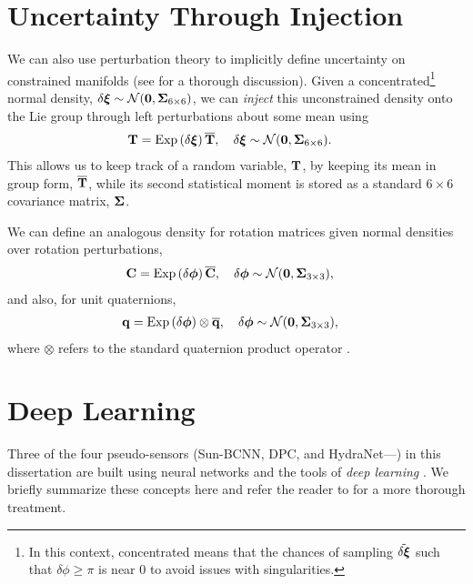 \section{Uncertainty Through Injection}

We can also use perturbation theory to implicitly define uncertainty on constrained manifolds (see \cite{Barfoot2014-ac} for a thorough discussion). Given a concentrated\footnote{In this context, concentrated means that the chances of sampling $\tilde{\delta \boldsymbol{\mathbf{\xi}}}$ such that $\delta \phi \geq \pi$ is near $0$ to avoid issues with singularities.} normal density, $\delta \boldsymbol{\mathbf{\xi}} \sim \mathcal{N}{}(\boldsymbol{\mathbf{0}}, \boldsymbol{\mathbf{\Sigma}}_{6 \times 6})$, we can \textit{inject} this unconstrained density onto the Lie group through left perturbations about some mean using
\begin{align}
\boldsymbol{\mathbf{T}} &= \mathrm{Exp}\left({\delta \boldsymbol{\mathbf{\xi}}}\right) \overline{\boldsymbol{\mathbf{T}}},\quad  \delta \boldsymbol{\mathbf{\xi}} \sim \mathcal{N}{}(\boldsymbol{\mathbf{0}}, \boldsymbol{\mathbf{\Sigma}}_{6 \times 6}).
\end{align}
This allows us to keep track of a random variable, $\boldsymbol{\mathbf{T}}$, by keeping its mean in group form, $\overline{\boldsymbol{\mathbf{T}}}$, while its second statistical moment is stored as a standard $6 \times 6$ covariance matrix, $\boldsymbol{\mathbf{\Sigma}}$.

We can define an analogous density for rotation matrices given normal densities over rotation perturbations,
\begin{align}
\boldsymbol{\mathbf{C}} &= \mathrm{Exp}\left({\delta \boldsymbol{\mathbf{\phi}}}\right) \overline{\boldsymbol{\mathbf{C}}}, \quad \delta \boldsymbol{\mathbf{\phi}} \sim \mathcal{N}{}(\boldsymbol{\mathbf{0}}, \boldsymbol{\mathbf{\Sigma}}_{3 \times 3}), 
\end{align}
and also, for unit quaternions,
\begin{align}
\boldsymbol{\mathbf{q}} &= \mathrm{Exp}\left({\delta \boldsymbol{\mathbf{\phi}}}\right) \otimes \overline{\boldsymbol{\mathbf{q}}}, \quad \delta \boldsymbol{\mathbf{\phi}} \sim \mathcal{N}{}(\boldsymbol{\mathbf{0}}, \boldsymbol{\mathbf{\Sigma}}_{3 \times 3}),
\end{align}
where $\otimes$ refers to the standard quaternion product operator \citep{Sola2017quaternion}. %


\section{Deep Learning}
Three of the four pseudo-sensors (Sun-BCNN, DPC, and HydraNet---) in this dissertation are built using neural networks and the tools of \textit{deep learning} \citep{LeCun2015-qf}. We briefly summarize these concepts here and refer the reader to \cite{Goodfellow-et-al-2016} for a more thorough treatment.

